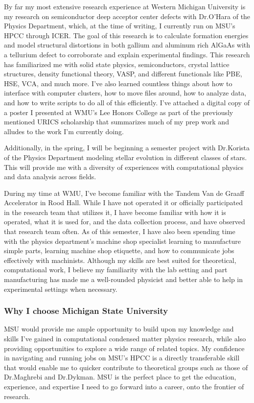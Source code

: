 \documentclass[11pt]{article}
\newcommand{\school}{Michigan State University}
\newcommand{\schoolabbr}{MSU}
\begin{document}
By far my most extensive research experience at Western Michigan University is my research on semiconductor deep acceptor center defects with Dr.\@ O'Hara of the Physics Department, which, at the time of writing, I currently run on MSU's HPCC through ICER. The goal of this research is to calculate formation energies and model structural distortions in both gallium and aluminum rich AlGaAs with a tellurium defect to corroborate and explain experimental findings. This research has familiarized me with solid state physics, semiconductors, crystal lattice structures, density functional theory, VASP, and different functionals like PBE, HSE, VCA, and much more. I've also learned countless things about how to interface with computer clusters, how to move files around, how to analyze data, and how to write scripts to do all of this efficiently. I've attached a digital copy of a poster I presented at WMU's Lee Honors College as part of the previously mentioned URICS scholarship that summarizes much of my prep work and alludes to the work I'm currently doing.

Additionally, in the spring, I will be beginning a semester project with Dr.\@ Korista of the Physics Department modeling stellar evolution in different classes of stars. This will provide me with a diversity of experiences with computational physics and data analysis across fields.

During my time at WMU, I've become familiar with the Tandem Van de Graaff Accelerator in Rood Hall. While I have not operated it or officially participated in the research team that utilizes it, I have become familiar with how it is operated, what it is used for, and the data collection process, and have observed that research team often. As of this semester, I have also been spending time with the physics department's machine shop specialist learning to manufacture simple parts, learning machine shop etiquette, and how to communicate jobs effectively with machinists. Although my skills are best suited for theoretical, computational work, I believe my familiarity with the lab setting and part manufacturing has made me a well-rounded physicist and better able to help in experimental settings when necessary.

\subsubsection*{Why I choose \school{}}
\schoolabbr{} would provide me ample opportunity to build upon my knowledge and skills I've gained in computational condensed matter physics research, while also providing opportunities to explore a wide range of related topics. My confidence in navigating and running jobs on MSU's HPCC is a directly transferable skill that would enable me to quicker contribute to theoretical groups such as those of Dr.\@ Maghrebi and Dr.\@ Dykman. \schoolabbr{} is the perfect place to get the education, experience, and expertise I need to go forward into a career, onto the frontier of research.
\end{document}
